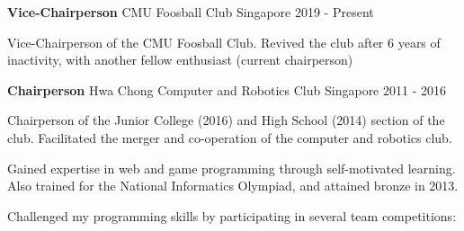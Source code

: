 

\begin{cventries}
	
	
	\cventry
	{\textbf{Vice-Chairperson}} %
	{CMU Foosball Club} %
	{Singapore} %
	{2019 - Present} %
	{ %
		\begin{cvitems}
			\item {Vice-Chairperson of the CMU Foosball Club. Revived the club after 6 years of inactivity, with another fellow enthusiast (current chairperson)}
		\end{cvitems}
	}
\end{cventries}

\begin{cventries}


\cventry
{\textbf{Chairperson}} %
{Hwa Chong Computer and Robotics Club} %
{Singapore} %
{2011 - 2016} %
{ %
\begin{cvitems}
	\item {Chairperson of the Junior College (2016) and High School (2014) section of the club. \newline
		Facilitated the merger and co-operation of the computer and robotics club.}
	\item {Gained expertise in web and game programming through self-motivated learning. \newline
		Also trained for the National Informatics Olympiad, and attained bronze in 2013.}
	\item {Challenged my programming skills by participating in several team competitions:}
\end{cvitems}
}
\end{cventries}


